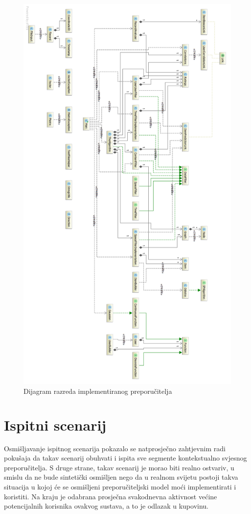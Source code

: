 \documentclass[times, utf8, diplomski, numeric]{fer}
\begin{document}
\begin{figure}[H]
	\centering
	\includegraphics[width=12cm]{images/diagramland.png}
	\caption{Dijagram razreda implementiranog preporučitelja}
	\label{fig:classdiagram}
\end{figure}

\section{Ispitni scenarij}
Osmišljavanje ispitnog scenarija pokazalo se natprosječno zahtjevnim radi
pokušaja da takav scenarij obuhvati i ispita sve segmente kontekstualno svjesnog
preporučitelja. S druge strane, takav scenarij je morao biti realno
ostvariv, u smislu da ne bude sintetički osmišljen nego da u realnom
svijetu postoji takva situacija u kojoj će se osmišljeni preporučiteljski
model moći implementirati i koristiti. Na kraju je odabrana prosječna
svakodnevna aktivnost većine potencijalnih korisnika ovakvog sustava, a to je
odlazak u kupovinu.
\end{document}
